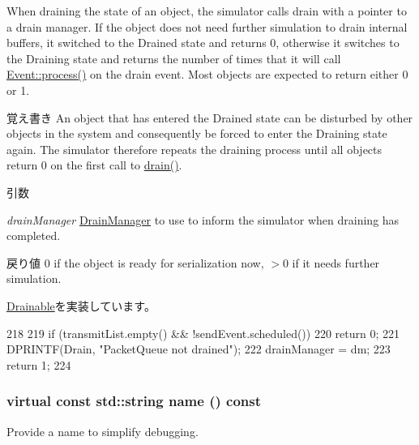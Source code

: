 When draining the state of an object, the simulator calls drain with a pointer to a drain manager. If the object does not need further simulation to drain internal buffers, it switched to the Drained state and returns 0, otherwise it switches to the Draining state and returns the number of times that it will call \hyperlink{classEvent_a142b75b68a6291400e20fb0dd905b1c8}{Event::process()} on the drain event. Most objects are expected to return either 0 or 1.

\begin{DoxyNote}{覚え書き}
An object that has entered the Drained state can be disturbed by other objects in the system and consequently be forced to enter the Draining state again. The simulator therefore repeats the draining process until all objects return 0 on the first call to \hyperlink{classPacketQueue_aa8a18d230dba7a674ac8a0b4f35bc36a}{drain()}.
\end{DoxyNote}

\begin{DoxyParams}{引数}
\item[{\em drainManager}]\hyperlink{classDrainManager}{DrainManager} to use to inform the simulator when draining has completed.\end{DoxyParams}
\begin{DoxyReturn}{戻り値}
0 if the object is ready for serialization now, $>$0 if it needs further simulation. 
\end{DoxyReturn}


\hyperlink{classDrainable_a1ed42c14f2f622ea6b0df3865e89c8b4}{Drainable}を実装しています。


\begin{DoxyCode}
218 {
219     if (transmitList.empty() && !sendEvent.scheduled())
220         return 0;
221     DPRINTF(Drain, "PacketQueue not drained\n");
222     drainManager = dm;
223     return 1;
224 }
\end{DoxyCode}
\hypertarget{classPacketQueue_a2d319721a65496069642871a52e47056}{
\subsubsection[{name}]{\setlength{\rightskip}{0pt plus 5cm}virtual const std::string name () const}}
\label{classPacketQueue_a2d319721a65496069642871a52e47056}
Provide a name to simplify debugging.


